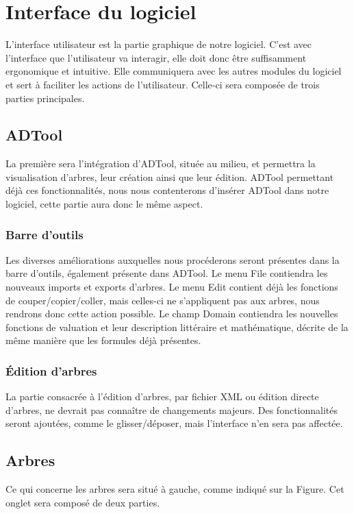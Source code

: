\section{Interface du logiciel}
L'interface utilisateur est la partie graphique de notre logiciel. C'est avec l'interface que l'utilisateur va interagir, elle doit donc être suffisamment ergonomique et intuitive. Elle communiquera avec les autres modules du logiciel et sert à faciliter les actions de l'utilisateur.
Celle-ci sera composée de trois parties principales.
	
	\subsection{ADTool}
La première sera l'intégration d'ADTool, située au milieu, et permettra la visualisation d'arbres, leur création ainsi que leur édition.
ADTool permettant déjà ces fonctionnalités, nous nous contenterons d'insérer ADTool dans notre logiciel, cette partie aura donc le même aspect.
	
		\subsubsection{Barre d'outils}
Les diverses améliorations auxquelles nous procéderons seront présentes dans la barre d'outils, également présente dans ADTool. Le menu \og File \fg contiendra les nouveaux imports et exports d'arbres. Le menu \og Edit \fg contient déjà les fonctions de couper/copier/coller, mais celles-ci ne s'appliquent pas aux arbres, nous rendrons donc cette action possible.
Le champ \og Domain \fg contiendra les nouvelles fonctions de valuation et leur description littéraire et mathématique, décrite de la même manière que les formules déjà présentes.

		\subsubsection{Édition d'arbres}
La partie consacrée à l'édition d'arbres, par fichier XML ou édition directe d'arbres, ne devrait pas connaître de changements majeurs. Des fonctionnalités seront ajoutées, comme le glisser/déposer, mais l'interface n'en sera pas affectée.

	\subsection{Arbres}
Ce qui concerne les arbres sera situé à gauche, comme indiqué sur la Figure. Cet onglet sera composé de deux parties.

